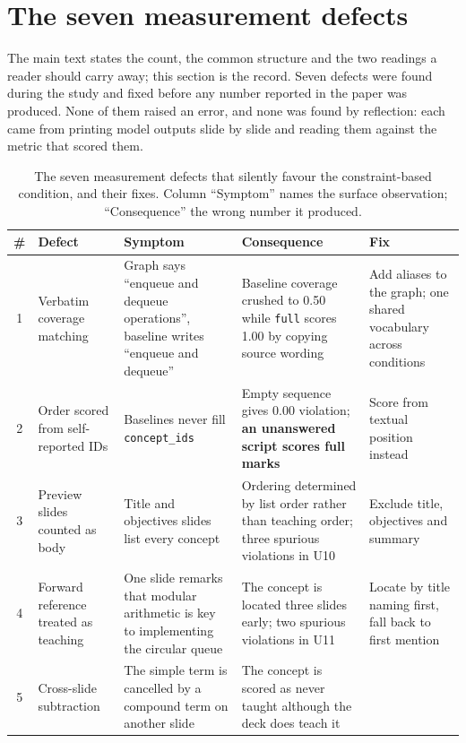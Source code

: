 \documentclass[11pt,a4paper]{article}
\newcommand{\id}[1]{\texttt{#1}}
\begin{document}
\section{The seven measurement defects}
\label{sec:s-defects}

The main text states the count, the common structure and the two readings a
reader should carry away; this section is the record. Seven defects were found
during the study and fixed before any number reported in the paper was
produced. None of them raised an error, and none was found by reflection: each
came from printing model outputs slide by slide and reading them against the
metric that scored them.

\begin{table}[htbp]
\centering
\caption{The seven measurement defects that silently favour the constraint-based
condition, and their fixes. Column ``Symptom'' names the surface observation;
``Consequence'' the wrong number it produced.}
\label{tab:s-defects}
\footnotesize
\setlength{\tabcolsep}{3pt}
\renewcommand{\arraystretch}{1.15}
\begin{tabularx}{\textwidth}{@{}cL{2.5cm}L{3.4cm}L{3.5cm}X@{}}
\toprule
\# & Defect & Symptom & Consequence & Fix \\
 & Verbatim coverage matching &
Graph says ``enqueue and dequeue operations'', baseline writes ``enqueue and
dequeue'' &
Baseline coverage crushed to 0.50 while \id{full} scores 1.00 by copying source
wording &
Add aliases to the graph; one shared vocabulary across conditions \\
2 & Order scored from self-reported IDs & Baselines never fill \id{concept\_ids} &
Empty sequence gives 0.00 violation; \textbf{an unanswered script scores full
marks} & Score from textual position instead \\
3 & Preview slides counted as body & Title and objectives slides list every
concept &
Ordering determined by list order rather than teaching order; three spurious
violations in U10 & Exclude title, objectives and summary \\
4 & Forward reference treated as teaching &
One slide remarks that modular arithmetic is key to implementing the circular
queue &
The concept is located three slides early; two spurious violations in U11 &
Locate by title naming first, fall back to first mention \\
5 & Cross-slide subtraction & The simple term is cancelled by a compound term on
another slide &
The concept is scored as never taught although the deck does teach it &

\end{tabularx}
\end{table}
\end{document}
